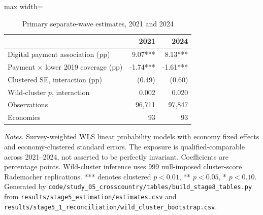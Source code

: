 \begin{table}[htbp]
\centering
\caption{Primary separate-wave estimates, 2021 and 2024}
\label{tab:stage8primary}
\begin{adjustbox}{max width=\textwidth}
\begin{tabular}{lrr}
\toprule
 & 2021 & 2024 \\
\midrule
Digital payment association (pp) & 9.07*** & 8.13*** \\
Payment $\times$ lower 2019 coverage (pp) & -1.74*** & -1.61*** \\
Clustered SE, interaction (pp) & (0.49) & (0.60) \\
Wild-cluster $p$, interaction & 0.002 & 0.020 \\
Observations & 96,711 & 97,847 \\
Economies & 93 & 93 \\
\bottomrule
\end{tabular}
\end{adjustbox}
\smallskip
\begin{minipage}{\linewidth}\footnotesize \emph{Notes.}
Survey-weighted WLS linear probability models with economy fixed effects and
economy-clustered standard errors. The exposure is qualified-comparable across
2021--2024, not asserted to be perfectly invariant. Coefficients are percentage
points. Wild-cluster inference uses 999 null-imposed cluster-score Rademacher
replications. *** denotes clustered $p<0.01$, ** $p<0.05$, * $p<0.10$.
Generated by \texttt{code/\allowbreak{}study\_05\_crosscountry/\allowbreak{}tables/\allowbreak{}build\_stage8\_tables.py}
from \texttt{results/\allowbreak{}stage5\_estimation/\allowbreak{}estimates.csv} and
\texttt{results/\allowbreak{}stage5\_1\_reconciliation/\allowbreak{}wild\_cluster\_bootstrap.csv}.\end{minipage}
\end{table}
